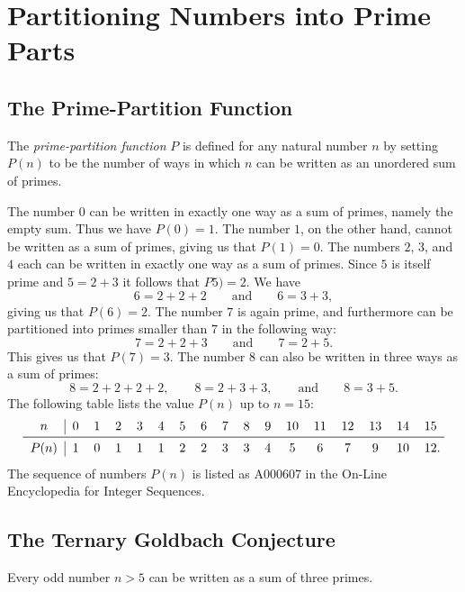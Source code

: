 \chapter{Partitioning Numbers into Prime Parts}

\section{The Prime-Partition Function}

\begin{definition}
  The \emph{prime-partition function} $P$ is defined for any natural number $n$ by setting $P(n)$ to be the number of ways in which $n$ can be written as an unordered sum of primes.
\end{definition}

\begin{example}
  The number $0$ can be written in exactly one way as a sum of primes, namely the empty sum. Thus we have $P(0)=1$. The number $1$, on the other hand, cannot be written as a sum of primes, giving us that $P(1)=0$. The numbers $2$, $3$, and $4$ each can be written in exactly one way as a sum of primes. Since $5$ is itself prime and $5=2+3$ it follows that $P5)=2$. We have
  \begin{equation*}
    6=2+2+2\qquad\text{and}\qquad 6=3+3,
  \end{equation*}
  giving us that $P(6)=2$. The number $7$ is again prime, and furthermore can be partitioned into primes smaller than $7$ in the following way:
  \begin{equation*}
    7=2+2+3\qquad\text{and}\qquad 7=2+5.
  \end{equation*}
  This gives us that $P(7)=3$. The number $8$ can also be written in three ways as a sum of primes:
  \begin{equation*}
    8=2+2+2+2,\qquad 8=2+3+3,\qquad\text{and}\qquad 8=3+5.
  \end{equation*}
  The following table lists the value $P(n)$ up to $n=15$:
  \begin{equation*}
    \begin{tabular}{c|cccccccccccccccc}
      $n$    & $0$ & $1$ & $2$ & $3$ & $4$ & $5$ & $6$ & $7$ & $8$ & $9$ & $10$ & $11$ & $12$ & $13$ & $14$ & $15$ \\ \midrule
      $P(n)$ & $1$ & $0$ & $1$ & $1$ & $1$ & $2$ & $2$ & $3$ & $3$ & $4$ & $5$  & $6$  & $7$  & $9$  & $10$ & $12$\makebox[0pt][l]{.}
    \end{tabular}
  \end{equation*}
  The sequence of numbers $P(n)$ is listed as A000607 in the On-Line Encyclopedia for Integer Sequences.
\end{example}

\section{The Ternary Goldbach Conjecture}

\begin{theorem}
  Every odd number $n> 5$ can be written as a sum of three primes.
\end{theorem}

